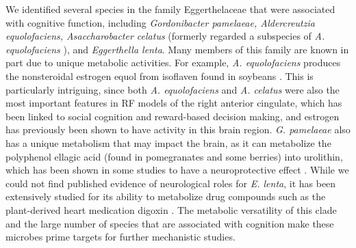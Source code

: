 \documentclass{article}
\begin{document}
We identified several species in the family Eggerthelaceae that were
associated with cognitive function, including \emph{Gordonibacter
pamelaeae, Aldercreutzia equolofaciens, Asaccharobacter celatus}
(formerly regarded a subspecies of \emph{A. equolofaciens}
\cite{takahashiCompleteGenomeSequence2021}),
and \emph{Eggerthella lenta}. Many members of this family are
known in part due to unique metabolic activities. For example, \emph{A.
equolofaciens} produces the nonsteroidal estrogen equol from isoflaven
found in soybeans \cite{wangEnantioselectiveSynthesisSEquol2005}.
This is particularly intriguing, since both \emph{A. equolofaciens} and \emph{A. celatus}
were also the most important features in RF models of the
right anterior cingulate, which has been linked to social cognition
and reward-based decision making\cite{appsAnteriorCingulateGyrus2016,boesRightAnteriorCingulate2008,bushDorsalAnteriorCingulate2002},
and estrogen has previously been shown to have activity 
in this brain region\cite{xiaoEstrogenAnteriorCingulate2013}.
\emph{G. pamelaeae} also has a unique metabolism that may impact the brain,
as it can metabolize the polyphenol ellagic acid
(found in pomegranates and some berries) into urolithin, which has been
shown in some studies to have a neuroprotective effect
\cite{gongUrolithinAlleviatesBloodbrain2022,selmaDescriptionUrolithinProduction2014}.
While we could not find published evidence of neurological roles for \emph{E. lenta},
it has been extensively studied for
its ability to metabolize drug compounds such as the plant-derived heart
medication digoxin \cite{haiserPredictingManipulatingCardiac2013}.
The metabolic versatility of this clade and the large number of
species that are associated with cognition make these microbes prime
targets for further mechanistic studies.
\end{document}
